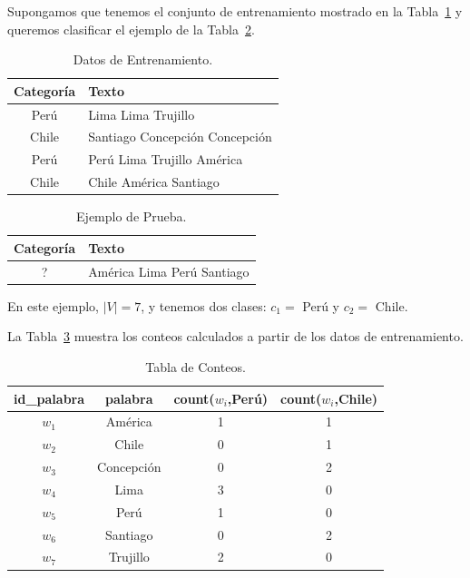 \begin{example}

Supongamos que tenemos el conjunto de entrenamiento mostrado en la Tabla~\ref{tab_nb_train} y queremos clasificar el ejemplo de la Tabla~\ref{tab_nb_test}.


\begin{table}[h]
\centering
\begin{tabular}{|c|p{}|}
\hline
\textbf{Categoría} & \textbf{Texto} \\
\hline
Perú & Lima Lima Trujillo \\
\hline
Chile & Santiago Concepción Concepción\\
\hline
Perú & Perú Lima Trujillo América\\
\hline
Chile & Chile América Santiago \\
\hline
\end{tabular}
\caption{Datos de Entrenamiento.}
\label{tab_nb_train}
\end{table}




\begin{table}[h]
\centering
\begin{tabular}{|c|p{}|}
\hline
\textbf{Categoría} & \textbf{Texto} \\
\hline
? & América Lima Perú Santiago \\
\hline
\end{tabular}
\caption{Ejemplo de Prueba.}
\label{tab_nb_test}
\end{table}

En este ejemplo, $|V|=7$, y tenemos dos clases: $c_1=$ Perú y $c_2=$ Chile.

La Tabla~\ref{tab_nb_conteos} muestra los conteos calculados a partir de los datos de entrenamiento.

\begin{table}[h]
\centering
\begin{tabular}{|c|c|c|c|}
\hline
id\_palabra & palabra & count($w_i$,Perú) & count($w_i$,Chile) \\
\hline
$w_1$ & América & 1 & 1 \\
$w_2$ & Chile & 0 & 1 \\
$w_3$ & Concepción & 0 & 2 \\
$w_4$ & Lima & 3 & 0 \\
$w_5$ & Perú & 1 & 0 \\
$w_6$ & Santiago & 0 & 2 \\
$w_7$ & Trujillo & 2 & 0 \\
\hline
\end{tabular}
\caption{Tabla de Conteos.}
\label{tab_nb_conteos}
\end{table}


\end{example}

